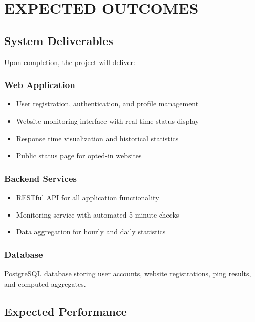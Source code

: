 \chapter{EXPECTED OUTCOMES}

\section{System Deliverables}

Upon completion, the project will deliver:

\subsection{Web Application}

\begin{itemize}
    \item User registration, authentication, and profile management
    \item Website monitoring interface with real-time status display
    \item Response time visualization and historical statistics
    \item Public status page for opted-in websites
\end{itemize}

\subsection{Backend Services}

\begin{itemize}
    \item RESTful API for all application functionality
    \item Monitoring service with automated 5-minute checks
    \item Data aggregation for hourly and daily statistics
\end{itemize}

\subsection{Database}

PostgreSQL database storing user accounts, website registrations, ping results, and computed aggregates.

\section{Expected Performance}


